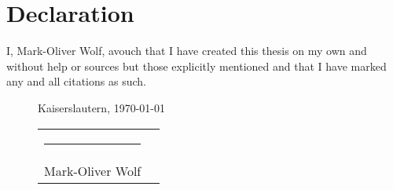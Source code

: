 \documentclass[]{scrartcl}
\begin{document}
			



	
	

\clearpage

\printbibliography[heading=bibintoc, title={References}]

\clearpage

\section*{Declaration}
	\vspace{2cm}
	
	\large
	I, Mark-Oliver Wolf, avouch that I have created this thesis on my own and without help or sources but those explicitly mentioned and that I have marked any and all citations as such.
	
	\vspace{3cm}
	\begin{figure}[b]
		Kaiserslautern, \today
		
		\vspace{2em}
		\begin{tabularx}{\linewidth}{@{}XX@{}}
			\hrule&\\
			Mark-Oliver Wolf & \\
		\end{tabularx}
	\end{figure}
\end{document}
